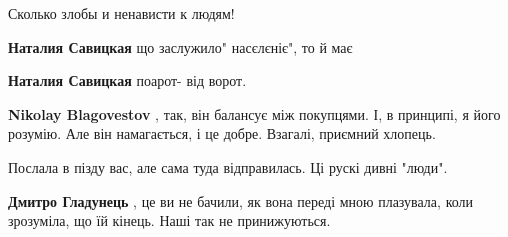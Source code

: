 \begin{itemize}
\begin{itemize}
Сколько злобы и ненависти к людям!

 
\textbf{Наталия Савицкая} що заслужило" насєлєніє", то й має

 
\textbf{Наталия Савицкая} поарот- від ворот.

 
\textbf{Nikolay Blagovestov} , так, він балансує між покупцями. І, в принципі, я його розумію. Але він намагається, і це добре. Взагалі, приємний хлопець.
\end{itemize}

 

Послала в пізду вас, але сама туда відправилась. Ці рускі дивні "люди".

\begin{itemize}
 
\textbf{Дмитро Гладунець} , це ви не бачили, як вона переді мною плазувала, коли зрозуміла, що їй кінець. Наші так не принижуються.
\end{itemize}

 

\end{itemize}
